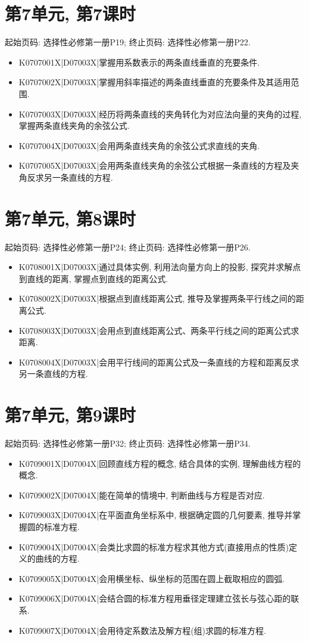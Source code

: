 \section*{第7单元, 第7课时}
起始页码: 选择性必修第一册P19; 终止页码: 选择性必修第一册P22.
\begin{itemize}
\item K0707001X|D07003X|掌握用系数表示的两条直线垂直的充要条件.
\item K0707002X|D07003X|掌握用斜率描述的两条直线垂直的充要条件及其适用范围.
\item K0707003X|D07003X|经历将两条直线的夹角转化为对应法向量的夹角的过程, 掌握两条直线夹角的余弦公式.
\item K0707004X|D07003X|会用两条直线夹角的余弦公式求直线的夹角.
\item K0707005X|D07003X|会用两条直线夹角的余弦公式根据一条直线的方程及夹角反求另一条直线的方程.
\end{itemize}

\section*{第7单元, 第8课时}
起始页码: 选择性必修第一册P24; 终止页码: 选择性必修第一册P26.
\begin{itemize}
\item K0708001X|D07003X|通过具体实例, 利用法向量方向上的投影, 探究并求解点到直线的距离, 掌握点到直线的距离公式.
\item K0708002X|D07003X|根据点到直线距离公式, 推导及掌握两条平行线之间的距离公式.
\item K0708003X|D07003X|会用点到直线距离公式、两条平行线之间的距离公式求距离.
\item K0708004X|D07003X|会用平行线间的距离公式及一条直线的方程和距离反求另一条直线的方程.
\end{itemize}

\section*{第7单元, 第9课时}
起始页码: 选择性必修第一册P32; 终止页码: 选择性必修第一册P34.
\begin{itemize}
\item K0709001X|D07004X|回顾直线方程的概念, 结合具体的实例, 理解曲线方程的概念.
\item K0709002X|D07004X|能在简单的情境中, 判断曲线与方程是否对应.
\item K0709003X|D07004X|在平面直角坐标系中, 根据确定圆的几何要素, 推导并掌握圆的标准方程.
\item K0709004X|D07004X|会类比求圆的标准方程求其他方式(直接用点的性质)定义的曲线的方程.
\item K0709005X|D07004X|会用横坐标、纵坐标的范围在圆上截取相应的圆弧.
\item K0709006X|D07004X|会结合圆的标准方程用垂径定理建立弦长与弦心距的联系.
\item K0709007X|D07004X|会用待定系数法及解方程(组)求圆的标准方程.
\end{itemize}

